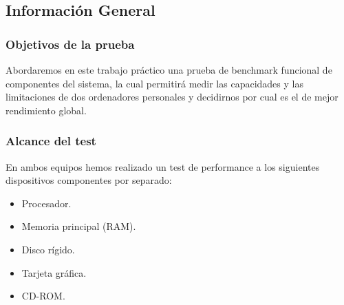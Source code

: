 \subsection{Información General}

\subsubsection{Objetivos de la prueba}
Abordaremos en este trabajo práctico una prueba de benchmark funcional de
componentes del sistema, la cual permitirá medir las capacidades y las
limitaciones de dos ordenadores personales y decidirnos por cual es el de mejor
rendimiento global.

\subsubsection{Alcance del test}
En ambos equipos hemos realizado un test de performance a los siguientes
dispositivos componentes por separado:

\begin{itemize}
  \item Procesador.
  \item Memoria principal (RAM).
  \item Disco rígido.
  \item Tarjeta gráfica.
  \item CD-ROM.
\end{itemize}


